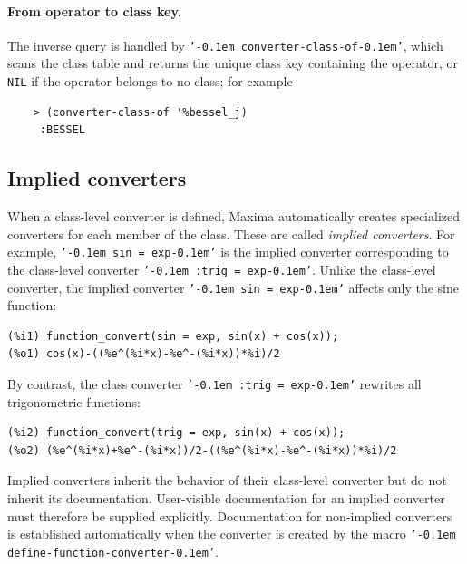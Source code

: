 \documentclass[12pt,fleqn]{extarticle}
\newcommand{\ttq}[1]{\texttt{'\kern-0.1em #1\kern-0.1em'}}
\newenvironment{maximabox}
  {\begin{tcolorbox}[
      breakable,
      enhanced,
      colback=white,
      colframe=black!8,
      boxrule=0pt,
      borderline west={2.2pt}{0pt}{black!25},
      arc=1pt,
      left=11pt,
      right=7pt,
      top=9pt,
      bottom=9pt,
      before skip=14pt,
      after skip=14pt
    ]}
  {\end{tcolorbox}}
\begin{document}
\paragraph{From operator to class key.}
The inverse query is handled by \ttq{converter-class-of}, which scans the
class table and returns the unique class key containing the operator, or
\texttt{NIL} if the operator belongs to no class; for example

\begin{maximabox}
  \begin{verbatim}
    > (converter-class-of '%bessel_j)
     :BESSEL
  \end{verbatim}
\end{maximabox}

\subsection{Implied converters} \label{subsec:implied-converters}

When a class-level converter is defined, Maxima automatically creates
specialized converters for each member of the class. These are called
\emph{implied converters}. For example, \ttq{sin = exp} is the implied
converter corresponding to the class-level converter \ttq{:trig = exp}.
Unlike the class-level converter, the implied converter \ttq{sin = exp}
affects only the sine function:
\begin{maximabox}
\begin{verbatim}
(%i1) function_convert(sin = exp, sin(x) + cos(x));
(%o1) cos(x)-((%e^(%i*x)-%e^-(%i*x))*%i)/2
\end{verbatim}
\end{maximabox}
\noindent By contrast, the class converter \ttq{:trig = exp} rewrites all
trigonometric functions:

\begin{maximabox}
\begin{verbatim}
(%i2) function_convert(trig = exp, sin(x) + cos(x));
(%o2) (%e^(%i*x)+%e^-(%i*x))/2-((%e^(%i*x)-%e^-(%i*x))*%i)/2
\end{verbatim}
\end{maximabox}
Implied converters inherit the behavior of their class-level converter but
do not inherit its documentation. User-visible documentation for an
implied converter must therefore be supplied explicitly. Documentation for
non‑implied converters is established automatically when the converter is
created by the macro \ttq{define-function-converter}. 
\end{document}
